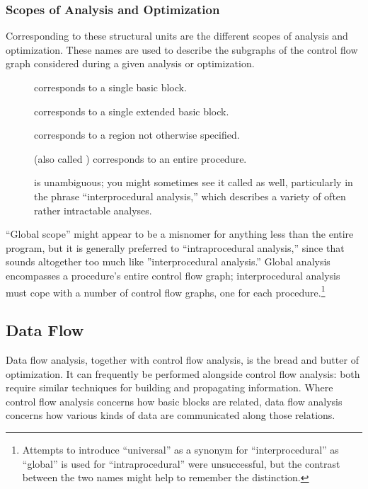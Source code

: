 

\subsubsection{Scopes of Analysis and Optimization}
Corresponding to these structural units are the different scopes of analysis and optimization. These names are used to describe the subgraphs of the control flow graph considered during a given analysis or optimization.
\begin{description}
\item[] corresponds to a single basic block.
\item[] corresponds to a single extended basic block.
\item[] corresponds to a region not otherwise specified.
\item[] (also called ) corresponds to an entire procedure.
\item[] is unambiguous; you might sometimes see it called  as well, particularly in the phrase ``interprocedural analysis,'' which describes a variety of often rather intractable analyses.
\end{description}
``Global scope'' might appear to be a misnomer for anything less than the entire program, but it is generally preferred to ``intraprocedural analysis,'' since that sounds altogether too much like ''interprocedural analysis.'' Global analysis encompasses a procedure's entire control flow graph; interprocedural analysis must cope with a number of control flow graphs, one for each procedure.\footnote{Attempts to introduce ``universal'' as a synonym for ``interprocedural'' as ``global'' is used for ``intraprocedural'' were unsuccessful, but the contrast between the two names might help to remember the distinction.}

\subsection{Data Flow}
Data flow analysis, together with control flow analysis, is the bread and butter of optimization. It can frequently be performed alongside control flow analysis: both require similar techniques for building and propagating information. Where control flow analysis concerns how basic blocks are related, data flow analysis concerns how various kinds of data are communicated along those relations.%

